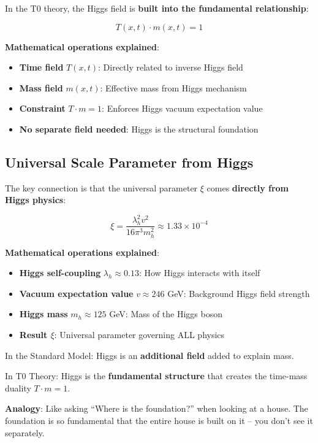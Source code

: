 \documentclass[12pt,a4paper]{article}
\newcommand{\xipar}{\xi}
\theoremstyle{definition}
\theoremstyle{remark}
\begin{document}
	In the T0 theory, the Higgs field is \textbf{built into the fundamental relationship}:
	
	\begin{equation}
		\boxed{T(x,t) \cdot m(x,t) = 1}
		\label{eq:higgs_foundation}
	\end{equation}
	
	\textbf{Mathematical operations explained}:
	\begin{itemize}
		\item \textbf{Time field} $T(x,t)$: Directly related to inverse Higgs field
		\item \textbf{Mass field} $m(x,t)$: Effective mass from Higgs mechanism
		\item \textbf{Constraint} $T \cdot m = 1$: Enforces Higgs vacuum expectation value
		\item \textbf{No separate field needed}: Higgs is the structural foundation
	\end{itemize}
	
	\subsection{Universal Scale Parameter from Higgs}
	
	The key connection is that the universal parameter $\xipar$ comes \textbf{directly from Higgs physics}:
	
	\begin{equation}
		\boxed{\xipar = \frac{\lambda_h^2 v^2}{16\pi^3 m_h^2} \approx 1.33 \times 10^{-4}}
		\label{eq:xi_from_higgs}
	\end{equation}
	
	\textbf{Mathematical operations explained}:
	\begin{itemize}
		\item \textbf{Higgs self-coupling} $\lambda_h \approx 0.13$: How Higgs interacts with itself
		\item \textbf{Vacuum expectation value} $v \approx 246$ GeV: Background Higgs field strength
		\item \textbf{Higgs mass} $m_h \approx 125$ GeV: Mass of the Higgs boson
		\item \textbf{Result $\xipar$}: Universal parameter governing ALL physics
	\end{itemize}
	
	\begin{tcolorbox}[colback=purple!5!white,colframe=purple!75!black,title=Higgs Integration in T0 Theory]
		In the Standard Model: Higgs is an \textbf{additional field} added to explain mass.
		
		In T0 Theory: Higgs is the \textbf{fundamental structure} that creates the time-mass duality $T \cdot m = 1$.
		
		\textbf{Analogy}: Like asking ``Where is the foundation?'' when looking at a house. The foundation is so fundamental that the entire house is built on it -- you don't see it separately.
	\end{tcolorbox}
	
\end{document}
